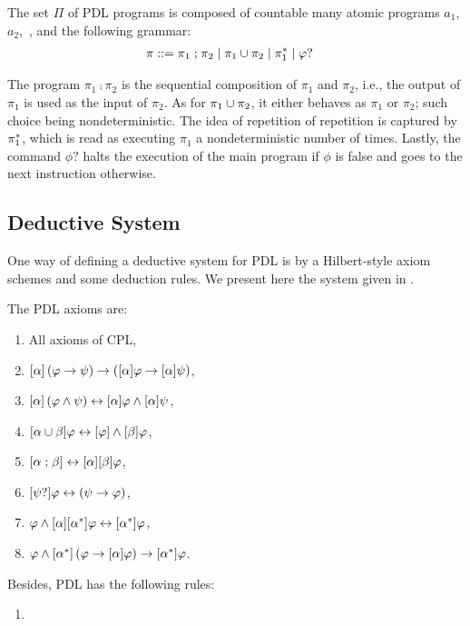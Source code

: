 \begin{definition}
The set $\Pi$ of  PDL programs is composed of countable many atomic programs $a_1$, $a_2$,~\etc, and the following grammar:
%
\begin{align*}
    \pi & \mathrel{::=} \pi_1\mathrel{;} \pi_2 \mid \pi_1\cup \pi_2 \mid \pi^*_1 \mid \varphi?
\end{align*}
\end{definition}
%
The program $\pi_1\comp \pi_2$ is the sequential composition of $\pi_1$ and $\pi_2$, i.e., the output of $\pi_1$ is used as the input of $\pi_2$. As for $\pi_1 \cup \pi_2$, it either behaves as $\pi_1$ or $\pi_2$; such choice being nondeterministic. The idea of repetition of repetition is captured by $\pi^*_1$, which is read as executing $\pi_1$ a nondeterministic number of times. Lastly, the command $\phi?$ halts the execution of the main program if $\phi$ is false and goes to the next instruction otherwise.

\subsection{Deductive System}
One way of defining a deductive system for PDL is by a Hilbert-style axiom schemes and some deduction rules. We present here the system given in \cite{harel2001dl}.

\begin{definition}
The PDL axioms are:
\begin{enumerate}
    \item All axioms of CPL, %
    \item $[\alpha] \left({\varphi \to \psi}\right) \to \left([\alpha] \varphi \to [\alpha] \psi\right)$,
    \item $[\alpha] \left(\varphi\land\psi\right) \leftrightarrow [\alpha] \varphi \land [\alpha] \psi$,
    \item $[\alpha\cup\beta] \varphi \leftrightarrow [\varphi] \land[\beta] \varphi$,
    \item $[\alpha\mathrel{;}\beta] \leftrightarrow[\alpha] [\beta] \varphi$,
    \item $[\psi?] \varphi\leftrightarrow(\psi\to\varphi)$,
    \item $\varphi\land[\alpha] [\alpha^*] \varphi \leftrightarrow [\alpha^*] \varphi$,
    \item $\varphi\land[\alpha^*] \left(\varphi\to[\alpha] \varphi\right)\to[\alpha^*] \varphi$.
\end{enumerate}
Besides, PDL has the following rules:
\begin{enumerate}
    \item 
\end{enumerate}
\end{definition}



